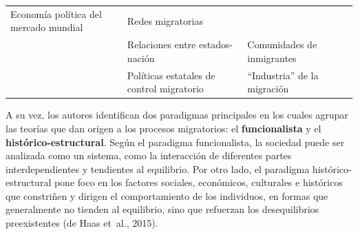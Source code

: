 \documentclass[12pt,spanish,]{article}
\begin{document}
\begin{longtable}[]{@{}llll@{}}
\begin{minipage}[t]{0.26\columnwidth}
Economía política del mercado mundial\strut
\end{minipage} & \begin{minipage}[t]{0.21\columnwidth}\raggedright
Redes migratorias\strut
\end{minipage} & \begin{minipage}[t]{0.34\columnwidth}\raggedright
\strut
\end{minipage}\tabularnewline
\begin{minipage}[t]{0.07\columnwidth}\raggedright
\strut
\end{minipage} & \begin{minipage}[t]{0.26\columnwidth}\raggedright
Relaciones entre estados-nación\strut
\end{minipage} & \begin{minipage}[t]{0.21\columnwidth}\raggedright
Comunidades de inmigrantes\strut
\end{minipage} & \begin{minipage}[t]{0.34\columnwidth}\raggedright
\strut
\end{minipage}\tabularnewline
\begin{minipage}[t]{0.07\columnwidth}\raggedright
\strut
\end{minipage} & \begin{minipage}[t]{0.26\columnwidth}\raggedright
Políticas estatales de control migratorio\strut
\end{minipage} & \begin{minipage}[t]{0.21\columnwidth}\raggedright
``Industria'' de la migración\strut
\end{minipage} & \begin{minipage}[t]{0.34\columnwidth}\raggedright
\strut
\end{minipage}\tabularnewline
\bottomrule
\end{longtable}

A su vez, los autores identifican dos paradigmas principales en los
cuales agrupar las teorías que dan origen a los procesos migratorios: el
\textbf{funcionalista} y el \textbf{histórico-estructural}. Según el
paradigma funcionalista, la sociedad puede ser analizada como un
sistema, como la interacción de diferentes partes interdependientes y
tendientes al equilibrio. Por otro lado, el paradigma
histórico-estructural pone foco en los factores sociales, económicos,
culturales e históricos que constriñen y dirigen el comportamiento de
los individuos, en formas que generalmente no tienden al equilibrio,
sino que refuerzan los desequilibrios preexistentes (de Haas et~al.,
2015).
\end{document}

